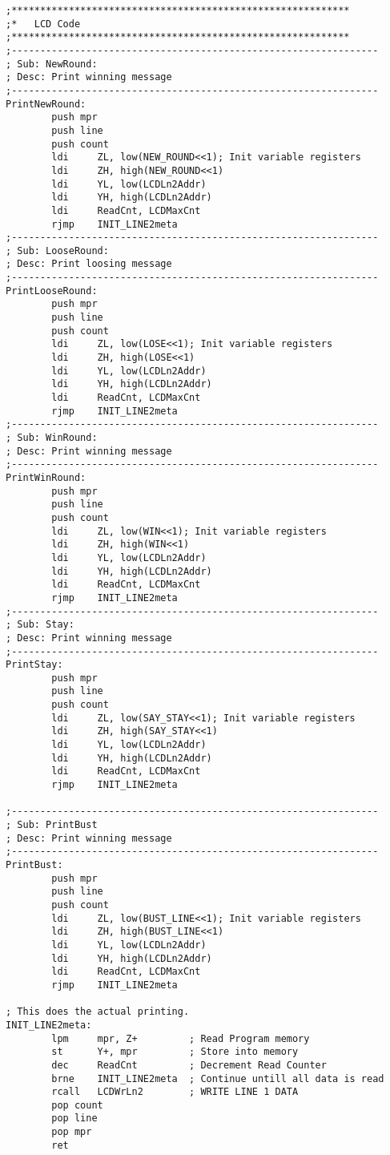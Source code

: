 \documentclass[10pt,letterpaper]{article}
\begin{document}
\begin{verbatim}
;***********************************************************
;*	 LCD Code
;***********************************************************
;----------------------------------------------------------------
; Sub: NewRound:
; Desc: Print winning message
;----------------------------------------------------------------
PrintNewRound:
        push mpr
        push line
        push count
		ldi		ZL, low(NEW_ROUND<<1); Init variable registers
		ldi		ZH, high(NEW_ROUND<<1)
		ldi		YL, low(LCDLn2Addr)
		ldi		YH, high(LCDLn2Addr)
		ldi		ReadCnt, LCDMaxCnt
        rjmp    INIT_LINE2meta
;----------------------------------------------------------------
; Sub: LooseRound:
; Desc: Print loosing message
;----------------------------------------------------------------
PrintLooseRound:
        push mpr
        push line
        push count
		ldi		ZL, low(LOSE<<1); Init variable registers
		ldi		ZH, high(LOSE<<1)
		ldi		YL, low(LCDLn2Addr)
		ldi		YH, high(LCDLn2Addr)
		ldi		ReadCnt, LCDMaxCnt
        rjmp    INIT_LINE2meta
;----------------------------------------------------------------
; Sub: WinRound:
; Desc: Print winning message
;----------------------------------------------------------------
PrintWinRound:
        push mpr
        push line
        push count
		ldi		ZL, low(WIN<<1); Init variable registers
		ldi		ZH, high(WIN<<1)
		ldi		YL, low(LCDLn2Addr)
		ldi		YH, high(LCDLn2Addr)
		ldi		ReadCnt, LCDMaxCnt
        rjmp    INIT_LINE2meta
;----------------------------------------------------------------
; Sub: Stay:
; Desc: Print winning message
;----------------------------------------------------------------
PrintStay:
        push mpr
        push line
        push count
		ldi		ZL, low(SAY_STAY<<1); Init variable registers
		ldi		ZH, high(SAY_STAY<<1)
		ldi		YL, low(LCDLn2Addr)
		ldi		YH, high(LCDLn2Addr)
		ldi		ReadCnt, LCDMaxCnt
        rjmp    INIT_LINE2meta

;----------------------------------------------------------------
; Sub: PrintBust
; Desc: Print winning message
;----------------------------------------------------------------
PrintBust:
        push mpr
        push line
        push count
		ldi		ZL, low(BUST_LINE<<1); Init variable registers
		ldi		ZH, high(BUST_LINE<<1)
		ldi		YL, low(LCDLn2Addr)
		ldi		YH, high(LCDLn2Addr)
		ldi		ReadCnt, LCDMaxCnt
        rjmp    INIT_LINE2meta

; This does the actual printing.
INIT_LINE2meta:
        lpm		mpr, Z+			; Read Program memory
        st		Y+, mpr			; Store into memory
        dec		ReadCnt			; Decrement Read Counter
        brne	INIT_LINE2meta	; Continue untill all data is read
        rcall	LCDWrLn2		; WRITE LINE 1 DATA
        pop count
        pop line
        pop mpr
        ret


\end{verbatim}
\end{document}
